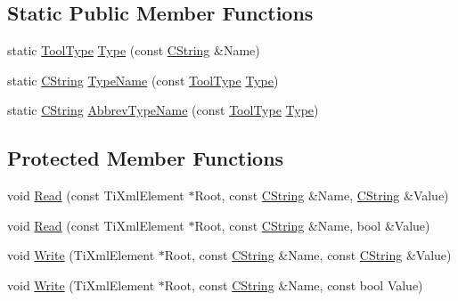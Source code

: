\subsection*{Static Public Member Functions}
\begin{DoxyCompactItemize}
\item 
static \hyperlink{classCBuildTool_a1a622843617ddf9b0ebb1c09c3437e6d}{Tool\-Type} \hyperlink{classCBuildTool_a6ca8c98420c412d3e2cc78f11ef7f869}{Type} (const \hyperlink{classCString}{C\-String} \&Name)
\item 
static \hyperlink{classCString}{C\-String} \hyperlink{classCBuildTool_a14f8eedbb567cd410216a162b23a8d57}{Type\-Name} (const \hyperlink{classCBuildTool_a1a622843617ddf9b0ebb1c09c3437e6d}{Tool\-Type} \hyperlink{classCBuildTool_a6ca8c98420c412d3e2cc78f11ef7f869}{Type})
\item 
static \hyperlink{classCString}{C\-String} \hyperlink{classCBuildTool_a83ed37c5be4cdf13846ff4ae7ecca16c}{Abbrev\-Type\-Name} (const \hyperlink{classCBuildTool_a1a622843617ddf9b0ebb1c09c3437e6d}{Tool\-Type} \hyperlink{classCBuildTool_a6ca8c98420c412d3e2cc78f11ef7f869}{Type})
\end{DoxyCompactItemize}
\subsection*{Protected Member Functions}
\begin{DoxyCompactItemize}
\item 
void \hyperlink{classCBuildTool_a475f533bf444e533415138afa8ffb1fb}{Read} (const Ti\-Xml\-Element $\ast$Root, const \hyperlink{classCString}{C\-String} \&Name, \hyperlink{classCString}{C\-String} \&Value)
\item 
void \hyperlink{classCBuildTool_a16323a65679c6a29302aa6e9de178637}{Read} (const Ti\-Xml\-Element $\ast$Root, const \hyperlink{classCString}{C\-String} \&Name, bool \&Value)
\item 
void \hyperlink{classCBuildTool_a8c938967f1db9034c192c7a72de70054}{Write} (Ti\-Xml\-Element $\ast$Root, const \hyperlink{classCString}{C\-String} \&Name, const \hyperlink{classCString}{C\-String} \&Value)
\item 
void \hyperlink{classCBuildTool_af44193a557ad2df62c683fa5a2bd237b}{Write} (Ti\-Xml\-Element $\ast$Root, const \hyperlink{classCString}{C\-String} \&Name, const bool Value)
\end{DoxyCompactItemize}
